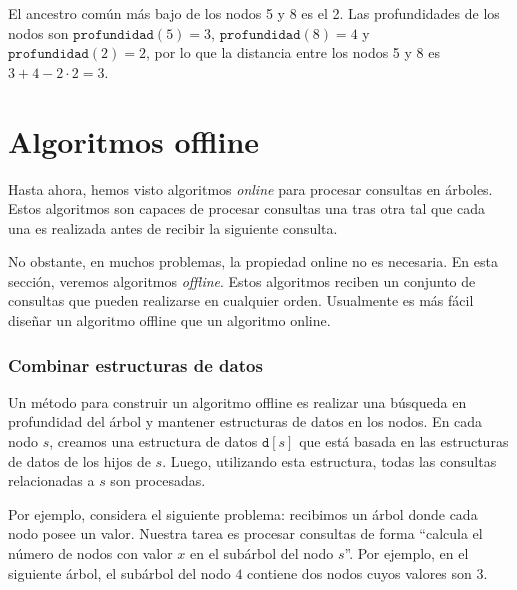 El ancestro común más bajo de los nodos 5 y 8 es el 2. Las profundidades
de los nodos son $\texttt{profundidad}(5)=3$, $\texttt{profundidad}(8)=4$
y $\texttt{profundidad}(2)=2$, por lo que la distancia entre los nodos
5 y 8 es $3+4-2\cdot2=3$.

\section{Algoritmos offline}

Hasta ahora, hemos visto algoritmos \emph{online} para procesar
consultas en árboles. Estos algoritmos son capaces de procesar
consultas una tras otra tal que cada una es realizada antes
de recibir la siguiente consulta.

No obstante, en muchos problemas, la propiedad online no es necesaria.
En esta sección, veremos algoritmos \emph{offline}. Estos algoritmos
reciben un conjunto de consultas que pueden realizarse en cualquier
orden. Usualmente es más fácil diseñar un algoritmo offline que un
algoritmo online.

\subsubsection{Combinar estructuras de datos}

Un método para construir un algoritmo offline es realizar una
búsqueda en profundidad del árbol y mantener estructuras de datos
en los nodos. En cada nodo $s$, creamos una estructura de datos
$\texttt{d}[s]$ que está basada en las estructuras de datos de los
hijos de $s$. Luego, utilizando esta estructura, todas las consultas
relacionadas a $s$ son procesadas.

Por ejemplo, considera el siguiente problema: recibimos un árbol
donde cada nodo posee un valor. Nuestra tarea es procesar consultas
de forma ``calcula el número de nodos con valor $x$ en el subárbol
del nodo $s$''. Por ejemplo, en el siguiente árbol, el subárbol del
nodo $4$ contiene dos nodos cuyos valores son 3.

